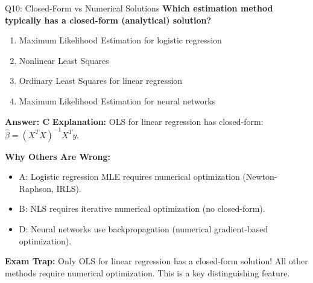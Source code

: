 \documentclass[8pt]{beamer}
\begin{document}
	\begin{frame}{Q10: Closed-Form vs Numerical Solutions}
		\fontsize{6.5}{7.5}\selectfont
		\textbf{Which estimation method typically has a closed-form (analytical) solution?}
		
		\begin{enumerate}
			\item Maximum Likelihood Estimation for logistic regression
			\item Nonlinear Least Squares
			\item Ordinary Least Squares for linear regression
			\item Maximum Likelihood Estimation for neural networks
		\end{enumerate}
		
		\vspace{0.05cm}
		\textcolor{myblue}{\textbf{Answer: C}}
		\vspace{0.05cm}
		\textcolor{myblue}{\textbf{Explanation:}} OLS for linear regression has closed-form: $\hat{\beta} = (X^T X)^{-1} X^T y$.
		
		\vspace{0.05cm}
		\textcolor{myred}{\textbf{Why Others Are Wrong:}}
		\begin{itemize}
			\item \textcolor{myred}{A:} Logistic regression MLE requires numerical optimization (Newton-Raphson, IRLS).
			\item \textcolor{myred}{B:} NLS requires iterative numerical optimization (no closed-form).
			\item \textcolor{myred}{D:} Neural networks use backpropagation (numerical gradient-based optimization).
		\end{itemize}
		
		\textcolor{myred}{\textbf{Exam Trap:}} Only \textcolor{myblue}{OLS for linear regression} has a closed-form solution! All other methods require numerical optimization. This is a key distinguishing feature.
	\end{frame}
	
\end{document}
